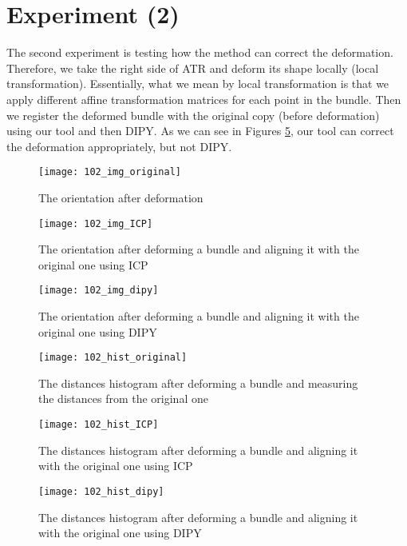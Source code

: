 \documentclass[../structure.tex]{subfiles}
\begin{document}
\section{Experiment (2)}
The second experiment is testing how the method can correct the deformation. Therefore, we take the right side of ATR and deform its shape locally (local transformation). Essentially, what we mean by local transformation is that we apply different affine transformation matrices for each point in the bundle. Then we register the deformed bundle with the original copy (before deformation) using our tool and then DIPY. As we can see in Figures \ref{fig:hist_icp_def}, our tool can correct the deformation appropriately, but not DIPY.

\begin{figure}[h!]
\centering
\texttt{[image: 102\_img\_original]}
\captionsetup{justification=centering}
\caption{The orientation after deformation}
\label{fig:img_original_def}
\end{figure}

\begin{figure}[h!]
\centering
\texttt{[image: 102\_img\_ICP]}
\captionsetup{justification=centering}
\caption{The orientation after deforming a bundle and aligning it with the original one using ICP}
\label{fig:img_icp_def}
\end{figure}

\begin{figure}[h!]
\centering
\texttt{[image: 102\_img\_dipy]}
\captionsetup{justification=centering}
\caption{The orientation after deforming a bundle and aligning it with the original one using DIPY}
\label{fig:img_dipy_def}
\end{figure}

\begin{figure}[h!]
\centering
\texttt{[image: 102\_hist\_original]}
\captionsetup{justification=centering}
\caption{The distances histogram after deforming a bundle and measuring the distances from the original one}
\label{fig:hist_original_def}
\end{figure}

\begin{figure}[h!]
\centering
\texttt{[image: 102\_hist\_ICP]}
\captionsetup{justification=centering}
\caption{The distances histogram after deforming a bundle and aligning it with the original one using ICP}
\label{fig:hist_icp_def}
\end{figure}

\begin{figure}[h!]
\centering
\texttt{[image: 102\_hist\_dipy]}
\captionsetup{justification=centering}
\caption{The distances histogram after deforming a bundle and aligning it with the original one using DIPY}
\label{fig:hist_dipy_def}
\end{figure}
\end{document}
